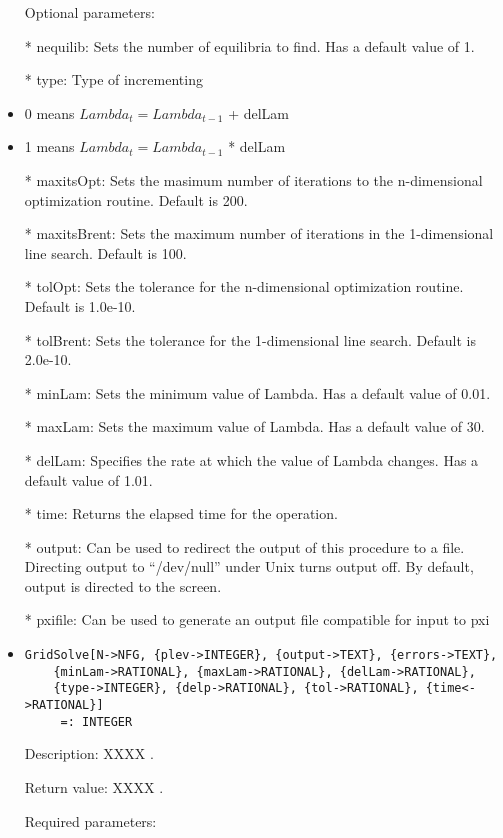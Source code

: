 \begin{itemize}
\item
[Optional parameters:]\hfil\null

\bd
\item
[* nequilib:] Sets the number of equilibria to find.  Has a default 
value of 1.  
\item
[* type:]  Type of incrementing 
	
\bd
\item
0 means $Lambda_t = Lambda_{t-1}$ + delLam
\item 
1 means $Lambda_t = Lambda_{t-1}$ * delLam
\ed

\item
[* maxitsOpt:] Sets the masimum number of iterations to the 
n-dimensional optimization routine.  Default is 200.
\item
[* maxitsBrent:] Sets the maximum number of iterations in
the 1-dimensional line search.  Default is 100.
\item
[* tolOpt:] Sets the tolerance for the n-dimensional
optimization routine.  Default is 1.0e-10.
\item
[* tolBrent:] Sets the tolerance for the 1-dimensional line
search.  Default is 2.0e-10.
\item
[* minLam:] Sets the minimum value of Lambda.  Has a default value of 0.01.
\item
[* maxLam:] Sets the maximum value of Lambda.  Has a default value of 30.
\item
[* delLam:] Specifies the rate at which the value of Lambda changes. Has a default value of 1.01.
\item
[* time:] Returns the elapsed time for the operation.
\item
[* output:] Can be used to redirect the output of this procedure to a
file.  Directing output to ``/dev/null'' under Unix turns output off.
By default, output is directed to the screen.
\item
[* pxifile:]Can be used to generate an output file
compatible for input to pxi
\ed
\ed

\item
\begin{verbatim}
GridSolve[N->NFG, {plev->INTEGER}, {output->TEXT}, {errors->TEXT},
	{minLam->RATIONAL}, {maxLam->RATIONAL}, {delLam->RATIONAL}, 
	{type->INTEGER}, {delp->RATIONAL}, {tol->RATIONAL}, {time<->RATIONAL}]
	 =: INTEGER
\end{verbatim}

\bd
\item
[Description:] XXXX .
\item
[Return value:] XXXX .
\item
[Required parameters:]\hfil\null
	

\end{itemize}
